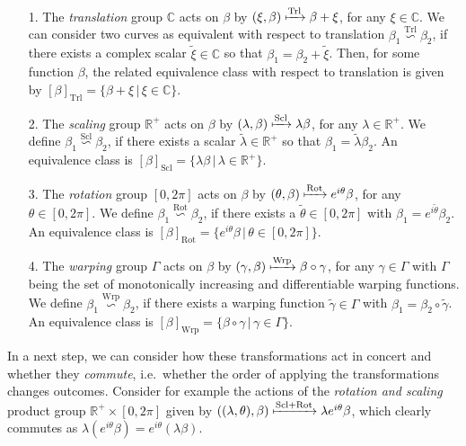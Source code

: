 \begin{itemize}[leftmargin=0.75cm]
  \item[1.] The \emph{translation} group $\mathbb{C}$ acts on $\beta$ by $(\xi, \beta) \xmapsto{\text{Trl}} \beta + \xi$, for any $\xi \in \mathbb{C}$.
    We can consider two curves as equivalent with respect to translation $\beta_1 \overset{\text{Trl}}{\backsim} \beta_2$, if there exists a complex scalar $\widetilde\xi \in \mathbb{C}$ so that $\beta_1 = \beta_2  + \widetilde\xi$.
    Then, for some function $\beta$, the related equivalence class with respect to translation is given by $[\beta]_{\text{Trl}} = \{\beta + \xi\, |\, \xi \in \mathbb{C}\}$.
  \item[2.] The \emph{scaling} group $\mathbb{R}^+$ acts on $\beta$ by $(\lambda, \beta) \xmapsto{\text{Scl}} \lambda \beta$, for any $\lambda \in \mathbb{R}^+$.
    We define $\beta_1 \overset{\text{Scl}}{\backsim} \beta_2$, if there exists a scalar $\widetilde\lambda \in \mathbb{R}^+$ so that $\beta_1 = \widetilde\lambda \beta_2$.
    An equivalence class is $[\beta]_{\text{Scl}} = \{\lambda\beta\,|\, \lambda \in \mathbb{R}^+\}$.
  \item[3.] The \emph{rotation} group $[0,2\pi]$ acts on $\beta$ by $(\theta, \beta) \xmapsto{\text{Rot}}  e^{i\theta} \beta$, for any $\theta \in [0,2\pi]$.
    We define $\beta_1 \overset{\text{Rot}}{\backsim} \beta_2$, if there exists a $\widetilde\theta \in [0,2\pi]$ with $\beta_1 = e^{i\widetilde\theta} \beta_2$.
    An equivalence class is $[\beta]_{\text{Rot}} = \{e^{i\theta}\beta\,|\, \theta \in [0,2\pi]\}$.
  \item[4.] The \emph{warping} group $\Gamma$ acts on $\beta$ by $(\gamma,\beta) \xmapsto{\text{Wrp}} \beta \circ \gamma$, for any $\gamma \in \Gamma$ with $\Gamma$ being the set of monotonically increasing and differentiable warping functions.
    We define $\beta_1 \overset{\text{Wrp}}{\backsim} \beta_2$, if there exists a warping function $\widetilde\gamma \in \Gamma$ with $\beta_1 = \beta_2 \circ \widetilde\gamma$.
    An equivalence class is $[\beta]_{\text{Wrp}} = \{\beta \circ \gamma\,|\, \gamma \in \Gamma\}$.
\end{itemize}
In a next step, we can consider how these transformations act in concert and whether they \textit{commute}, i.e.\ whether the order of applying the transformations changes outcomes.
Consider for example the actions of the \emph{rotation and scaling} product group $\mathbb{R}^+ \times [0,2\pi]$ given by $\left((\lambda, \theta), \beta\right) \xmapsto{\text{Scl} + \text{Rot}} \lambda e^{i\theta} \beta$, which clearly commutes as $\lambda(e^{i\theta}\beta) = e^{i\theta}(\lambda\beta)$.
